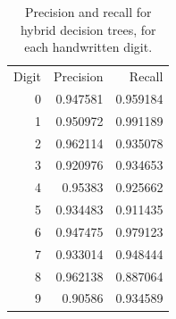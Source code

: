 \begin{table}
	\centering
	\begin{tabular}{rrr}
		\hline
		Digit &   Precision &   Recall \\
		0 &    0.947581 & 0.959184 \\
		1 &    0.950972 & 0.991189 \\
		2 &    0.962114 & 0.935078 \\
		3 &    0.920976 & 0.934653 \\
		4 &    0.95383  & 0.925662 \\
		5 &    0.934483 & 0.911435 \\
		6 &    0.947475 & 0.979123 \\
		7 &    0.933014 & 0.948444 \\
		8 &    0.962138 & 0.887064 \\
		9 &    0.90586  & 0.934589 \\
	\end{tabular}
	\caption{Precision and recall for hybrid decision trees, for each handwritten digit.}
	\label{table:with_kd_precision_recall}
\end{table}